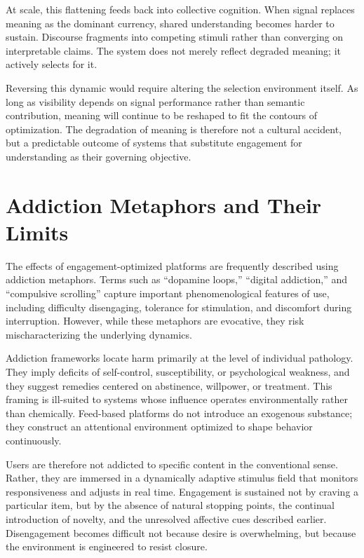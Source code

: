 \documentclass[12pt]{article}
\begin{document}
At scale, this flattening feeds back into collective cognition. When signal replaces meaning as the dominant currency, shared understanding becomes harder to sustain. Discourse fragments into competing stimuli rather than converging on interpretable claims. The system does not merely reflect degraded meaning; it actively selects for it.

Reversing this dynamic would require altering the selection environment itself. As long as visibility depends on signal performance rather than semantic contribution, meaning will continue to be reshaped to fit the contours of optimization. The degradation of meaning is therefore not a cultural accident, but a predictable outcome of systems that substitute engagement for understanding as their governing objective.

\section{Addiction Metaphors and Their Limits}

The effects of engagement-optimized platforms are frequently described using addiction metaphors. Terms such as ``dopamine loops,'' ``digital addiction,'' and ``compulsive scrolling'' capture important phenomenological features of use, including difficulty disengaging, tolerance for stimulation, and discomfort during interruption. However, while these metaphors are evocative, they risk mischaracterizing the underlying dynamics.

Addiction frameworks locate harm primarily at the level of individual pathology. They imply deficits of self-control, susceptibility, or psychological weakness, and they suggest remedies centered on abstinence, willpower, or treatment. This framing is ill-suited to systems whose influence operates environmentally rather than chemically. Feed-based platforms do not introduce an exogenous substance; they construct an attentional environment optimized to shape behavior continuously.

Users are therefore not addicted to specific content in the conventional sense. Rather, they are immersed in a dynamically adaptive stimulus field that monitors responsiveness and adjusts in real time. Engagement is sustained not by craving a particular item, but by the absence of natural stopping points, the continual introduction of novelty, and the unresolved affective cues described earlier. Disengagement becomes difficult not because desire is overwhelming, but because the environment is engineered to resist closure.
\end{document}
